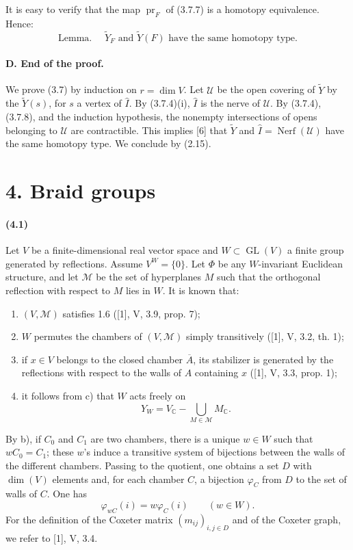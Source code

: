 \documentclass[10pt]{article}
\newcommand{\C}{\mathbb C}
\newcommand{\GL}{\operatorname{GL}}
\begin{document}
It is easy to verify that the map \(\operatorname{pr}_F\) of (3.7.7) is a homotopy equivalence. Hence:
\[
\tag{3.7.8}
\text{Lemma. }\quad
\widetilde Y_F\text{ and }\widetilde Y(F)\text{ have the same homotopy type.}
\]

\paragraph{D. End of the proof.} We prove (3.7) by induction on \(r=\dim V\). Let \(\mathcal U\) be the open covering of \(\widetilde Y\) by the \(\widetilde Y(s)\), for \(s\) a vertex of \(\widehat I\). By (3.7.4)(i), \(\widehat I\) is the nerve of \(\mathcal U\). By (3.7.4), (3.7.8), and the induction hypothesis, the nonempty intersections of opens belonging to \(\mathcal U\) are contractible. This implies [6] that \(\widetilde Y\) and \(\widehat I=\operatorname{Nerf}(\mathcal U)\) have the same homotopy type. We conclude by (2.15).

\section*{4. Braid groups}

\paragraph{(4.1)} Let \(V\) be a finite-dimensional real vector space and \(W\subset\GL(V)\) a finite group generated by reflections. Assume \(V^W=\{0\}\). Let \(\Phi\) be any \(W\)-invariant Euclidean structure, and let \(\mathcal M\) be the set of hyperplanes \(M\) such that the orthogonal reflection with respect to \(M\) lies in \(W\). It is known that:
\begin{enumerate}[label=\alph*)]
\item \((V,\mathcal M)\) satisfies 1.6 ([1], V, 3.9, prop. 7);
\item \(W\) permutes the chambers of \((V,\mathcal M)\) simply transitively ([1], V, 3.2, th. 1);
\item if \(x\in V\) belongs to the closed chamber \(\overline A\), its stabilizer is generated by the reflections with respect to the walls of \(A\) containing \(x\) ([1], V, 3.3, prop. 1);
\item it follows from c) that \(W\) acts freely on
\[
Y_W=V_\C-\bigcup_{M\in\mathcal M}M_\C.
\]
\end{enumerate}
By b), if \(C_0\) and \(C_1\) are two chambers, there is a unique \(w\in W\) such that \(wC_0=C_1\); these \(w\)'s induce a transitive system of bijections between the walls of the different chambers. Passing to the quotient, one obtains a set \(D\) with \(\dim(V)\) elements and, for each chamber \(C\), a bijection \(\varphi_C\) from \(D\) to the set of walls of \(C\). One has
\[
\tag{4.1.1}
\varphi_{wC}(i)=w\varphi_C(i)\qquad(w\in W).
\]
For the definition of the Coxeter matrix \((m_{ij})_{i,j\in D}\) and of the Coxeter graph, we refer to [1], V, 3.4.
\end{document}
